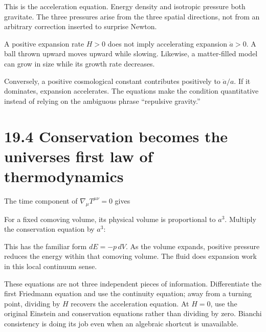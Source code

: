 \documentclass[
  11pt,
  letterpaper,
  oneside,
  openany]{scrbook}
\begin{document}
This is the acceleration equation. Energy density and isotropic pressure
both gravitate. The three pressures arise from the three spatial
directions, not from an arbitrary correction inserted to surprise
Newton.

A positive expansion rate \(H>0\) does not imply accelerating expansion
\(\ddot a>0\). A ball thrown upward moves upward while slowing.
Likewise, a matter-filled model can grow in size while its growth rate
decreases.

Conversely, a positive cosmological constant contributes positively to
\(\ddot a/a\). If it dominates, expansion accelerates. The equations
make the condition quantitative instead of relying on the ambiguous
phrase ``repulsive gravity.''

\hypertarget{conservation-becomes-the-universes-first-law-of-thermodynamics}{%
\section{19.4 Conservation becomes the universe\textquotesingle s first
law of
thermodynamics}\label{conservation-becomes-the-universes-first-law-of-thermodynamics}}

The time component of \(\nabla_\mu T^{\mu\nu}=0\) gives

\begin{center}
\begingroup
{}
\ifdim\wd\grmathbox>\linewidth
\resizebox{\linewidth}{!}{\usebox{\grmathbox}}
\else\usebox{\grmathbox}\fi
\endgroup
\end{center}

For a fixed comoving volume, its physical volume is proportional to
\(a^3\). Multiply the conservation equation by \(a^3\):

\begin{center}
\begingroup
{}
\ifdim\wd\grmathbox>\linewidth
\resizebox{\linewidth}{!}{\usebox{\grmathbox}}
\else\usebox{\grmathbox}\fi
\endgroup
\end{center}

This has the familiar form \(dE=-p\,dV\). As the volume expands,
positive pressure reduces the energy within that comoving volume. The
fluid does expansion work in this local continuum sense.

These equations are not three independent pieces of information.
Differentiate the first Friedmann equation and use the continuity
equation; away from a turning point, dividing by \(H\) recovers the
acceleration equation. At \(H=0\), use the original Einstein and
conservation equations rather than dividing by zero. Bianchi consistency
is doing its job even when an algebraic shortcut is unavailable.
\end{document}
